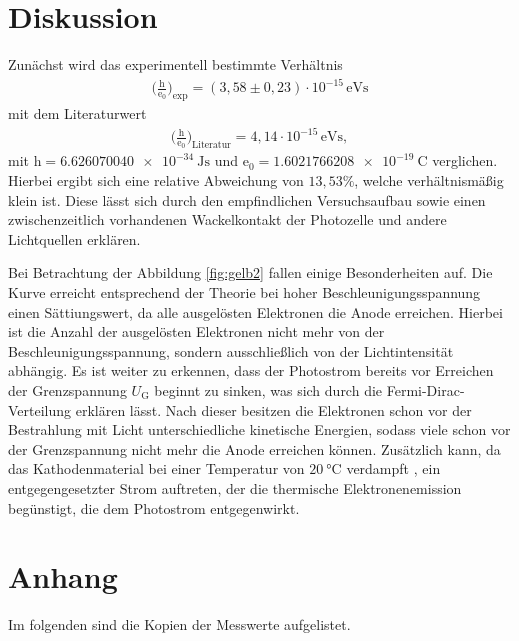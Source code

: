 \section{Diskussion}
\label{sec:Diskussion}

Zunächst wird das experimentell bestimmte Verhältnis 
\begin{align*}
\bigl(\frac{\mathrm{h}}{\mathrm{e_0}}\bigr)_\text{exp} = (3,58 \pm 0,23)\cdot 10^{-15}\,\si{\eV\second} 
\end{align*}
mit dem Literaturwert 
\begin{align*}
\bigl(\frac{\mathrm{h}}{\mathrm{e_0}}\bigr)_\text{Literatur} = 4,14 \cdot 10^{-15}\,\si{\eV\second}, 
\end{align*}
mit $\mathrm{h} = \SI{6.626070040e-34}{\joule\second}$ \cite{h} und $\mathrm{e_0} = \SI{1.6021766208e-19}{\coulomb}$ \cite{e} verglichen.
Hierbei ergibt sich eine relative Abweichung von $13,53\%$, welche verhältnismäßig klein ist.
Diese lässt sich durch den empfindlichen Versuchsaufbau sowie einen zwischenzeitlich vorhandenen
Wackelkontakt der Photozelle und andere Lichtquellen erklären.

\noindent Bei Betrachtung der Abbildung \ref{fig:gelb2} fallen einige Besonderheiten auf.
Die Kurve erreicht entsprechend der Theorie bei hoher Beschleunigungsspannung einen Sättiungswert,
da alle ausgelösten Elektronen die Anode erreichen. Hierbei ist die Anzahl der ausgelösten Elektronen
nicht mehr von der Beschleunigungsspannung, sondern ausschließlich von der Lichtintensität abhängig.
Es ist weiter zu erkennen, dass der Photostrom bereits vor Erreichen der Grenzspannung $U_\text{G}$
beginnt zu sinken, was sich durch die Fermi-Dirac-Verteilung erklären lässt. Nach dieser besitzen die
Elektronen schon vor der Bestrahlung mit Licht unterschiedliche kinetische Energien, sodass viele
schon vor der Grenzspannung nicht mehr die Anode erreichen können. Zusätzlich kann, da das 
Kathodenmaterial bei einer Temperatur von $\SI{20}{\celsius}$
verdampft \cite{kent}, ein entgegengesetzter Strom auftreten, 
der die thermische Elektronenemission begünstigt, die dem Photostrom entgegenwirkt.

\section{Anhang}
\label{Anhang}
Im folgenden sind die Kopien der Messwerte aufgelistet.

